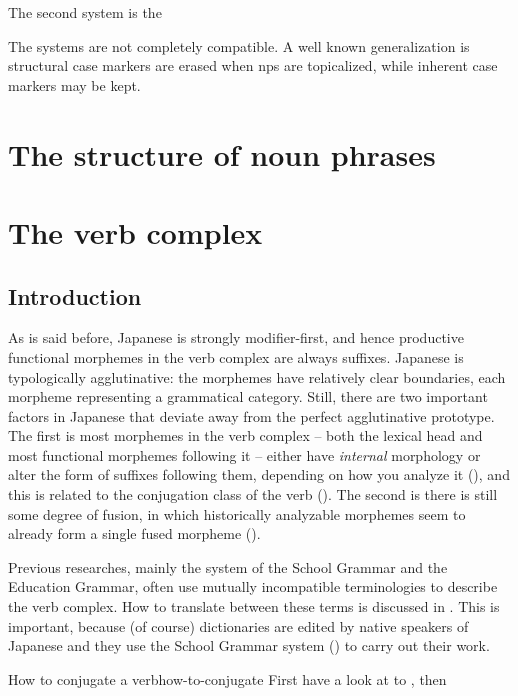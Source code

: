 \documentclass[UTF8, a4paper, oneside, scheme=plain]{ctexrep}
\begin{document}
The second system is the 

The systems are not completely compatible.
A well known generalization is structural case markers are erased when \ac{np}s are topicalized,
while inherent case markers may be kept.

\chapter{The structure of noun phrases}

\chapter{The verb complex}\label{chap:verb-complex}

\section{Introduction}

As is said before, Japanese is strongly modifier-first,
and hence productive functional morphemes in the verb complex are always suffixes.
Japanese is typologically agglutinative:
the morphemes have relatively clear boundaries,
each morpheme representing a grammatical category.
Still, there are two important factors in Japanese that deviate away 
from the perfect agglutinative prototype.
The first is most morphemes in the verb complex 
-- both the lexical head and most functional morphemes following it --
either have \emph{internal} morphology or alter the form of suffixes following them,
depending on how you analyze it (),
and this is related to the conjugation class of the verb ().
The second is there is still some degree of fusion, 
in which historically analyzable morphemes seem to already form a single fused morpheme 
().

Previous researches, mainly the system of the School Grammar and the Education Grammar,
often use mutually incompatible terminologies to describe the verb complex.
How to translate between these terms is discussed in .
This is important,
because (of course) dictionaries are edited by native speakers of Japanese
and they use the School Grammar system () to carry out their work.

\begin{learnbox}{How to conjugate a verb}{how-to-conjugate}
    First have a look at  to ,
    then 
\end{learnbox}
\end{document}

